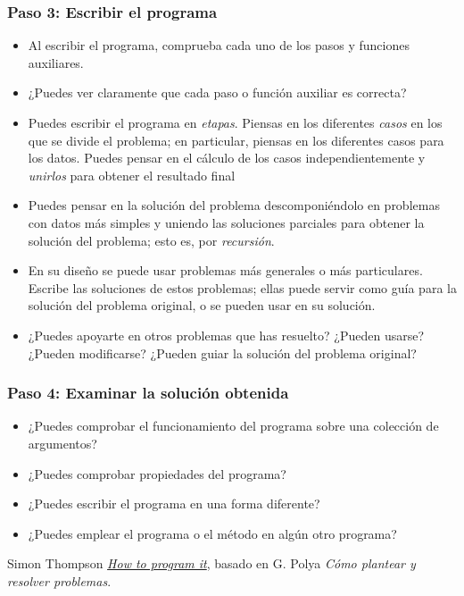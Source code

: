 \subsubsection*{Paso 3: Escribir el programa}
\begin{itemize}
\item Al escribir el programa, comprueba cada uno de los pasos y funciones
  auxiliares.
\item ¿Puedes ver claramente que cada paso o función auxiliar es correcta?
\item Puedes escribir el programa en \emph{etapas}. Piensas en los diferentes
  \emph{casos} en los que se divide el problema; en particular, piensas en los
  diferentes casos para los datos. Puedes pensar en el cálculo de los casos
  independientemente y \emph{unirlos} para obtener el resultado final
\item Puedes pensar en la solución del problema descomponiéndolo en problemas
  con datos más simples y uniendo las soluciones parciales para obtener la
  solución del problema; esto es, por \emph{recursión}.
\item En su diseño se puede usar problemas más generales o más
  particulares. Escribe las soluciones de estos problemas; ellas puede servir
  como guía para la solución del problema original, o se pueden usar en su
  solución.
\item ¿Puedes apoyarte en otros problemas que has resuelto? ¿Pueden usarse?
  ¿Pueden modificarse? ¿Pueden guiar la solución del problema original?
\end{itemize}

\subsubsection*{Paso 4: Examinar la solución obtenida}
\begin{itemize}
\item ¿Puedes comprobar el funcionamiento del programa sobre una colección de
  argumentos?
\item ¿Puedes comprobar propiedades del programa?
\item ¿Puedes escribir el programa en una forma diferente?
\item ¿Puedes emplear el programa o el método en algún otro programa?
\end{itemize}

\noindent
Simon Thompson
\href{http://www.cs.kent.ac.uk/people/staff/sjt/Haskell_craft/HowToProgIt.html}
     {\emph{How to program it}},
basado en G. Polya \emph{Cómo plantear y resolver problemas}.
